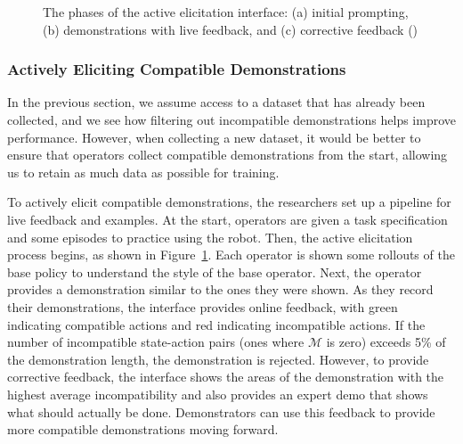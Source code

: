 \documentclass[
  letterpaper,
  numbers=noenddot,
  DIV=11]{scrreprt}
\theoremstyle{definition}
\theoremstyle{plain}
\theoremstyle{plain}
\theoremstyle{remark}
\begin{document}
\begin{figure}


\caption{\label{fig-active_elicitation}The phases of the active
elicitation interface: (a) initial prompting, (b) demonstrations with
live feedback, and (c) corrective feedback
()}

\end{figure}%

\subsubsection*{Actively Eliciting Compatible
Demonstrations}\label{actively-eliciting-compatible-demonstrations}

In the previous section, we assume access to a dataset that has already
been collected, and we see how filtering out incompatible demonstrations
helps improve performance. However, when collecting a new dataset, it
would be better to ensure that operators collect compatible
demonstrations from the start, allowing us to retain as much data as
possible for training.

To actively elicit compatible demonstrations, the researchers set up a
pipeline for live feedback and examples. At the start, operators are
given a task specification and some episodes to practice using the
robot. Then, the active elicitation process begins, as shown in
Figure~\ref{fig-active_elicitation}. Each operator is shown some
rollouts of the base policy to understand the style of the base
operator. Next, the operator provides a demonstration similar to the
ones they were shown. As they record their demonstrations, the interface
provides online feedback, with green indicating compatible actions and
red indicating incompatible actions. If the number of incompatible
state-action pairs (ones where \(\mathcal{M}\) is zero) exceeds 5\% of
the demonstration length, the demonstration is rejected. However, to
provide corrective feedback, the interface shows the areas of the
demonstration with the highest average incompatibility and also provides
an expert demo that shows what should actually be done. Demonstrators
can use this feedback to provide more compatible demonstrations moving
forward.
\end{document}

